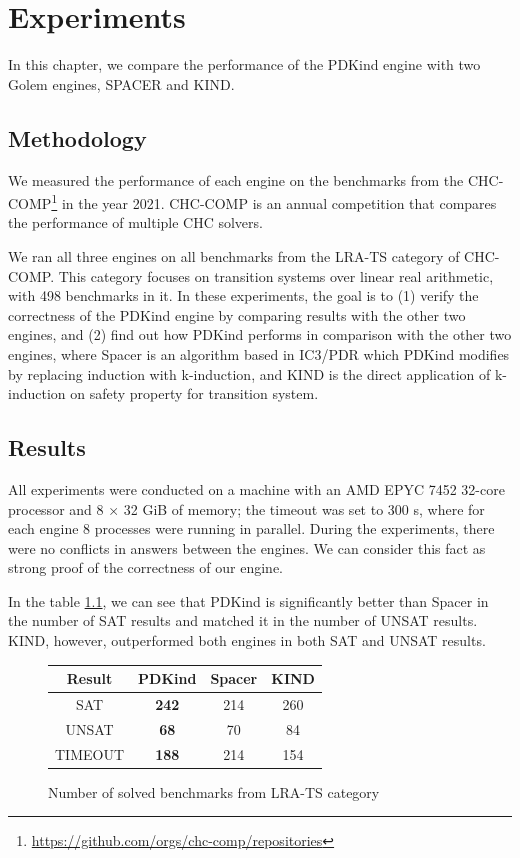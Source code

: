 \chapter{Experiments}
\noindent In this chapter, we compare the performance of the PDKind engine with two Golem engines, SPACER and KIND.

\section{Methodology}
\noindent We measured the performance of each engine on the benchmarks from the CHC-COMP\footnote{\url{https://github.com/orgs/chc-comp/repositories}} in the year 2021. CHC-COMP is an annual competition that compares the performance of multiple CHC solvers.

We ran all three engines on all benchmarks from the LRA-TS category of CHC-COMP. This category focuses on transition systems over linear real arithmetic, with 498 benchmarks in it. In these experiments, the goal is to (1) verify the correctness of the PDKind engine by comparing results with the other two engines, and (2) find out how PDKind performs in comparison with the other two engines, where Spacer is an algorithm based in IC3/PDR which PDKind modifies by replacing induction with k-induction, and KIND is the direct application of k-induction on safety property for transition system.



\section{Results}
\noindent All experiments were conducted on a machine with an AMD EPYC 7452 32-core processor and 8 × 32 GiB of memory; the timeout was set to 300 s, where for each engine 8 processes were running in parallel. During the experiments, there were no conflicts in answers between the engines. We can consider this fact as strong proof of the correctness of our engine.

In the table \ref{tab:results}, we can see that PDKind is significantly better than Spacer in the number of SAT results and matched it in the number of UNSAT results. KIND, however, outperformed both engines in both SAT and UNSAT results.


\renewcommand{\figurename}{Table}
\begin{figure}[H]
\centering
\begin{tabular}{|c|c|c|c|}
\hline
Result & \textbf{PDKind} & Spacer & KIND \\
\hline
SAT & \textbf{242} & 214 & 260 \\
\hline
UNSAT & \textbf{68} & 70 & 84 \\
\hline
TIMEOUT & \textbf{188} & 214 & 154 \\
\hline
\end{tabular}
\caption{Number of solved benchmarks from LRA-TS category} %
\label{tab:results}
\end{figure}

